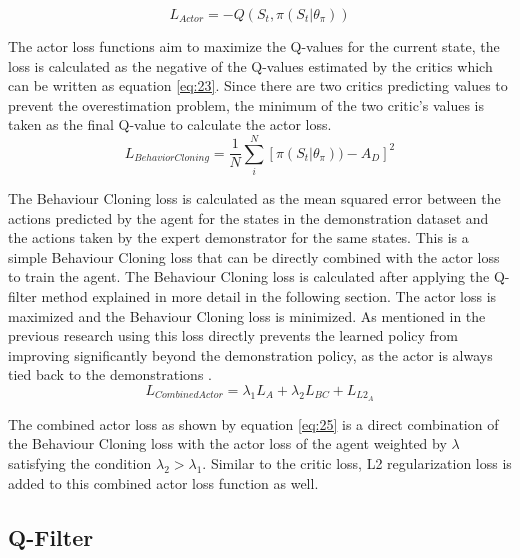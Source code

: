 \begin{equation}\label{eq:23}
    L_{Actor} = -Q(S_{t}, \pi(S_{t} | \theta_\pi ))
\end{equation}

The actor loss functions aim to maximize the Q-values for the current state, the loss is calculated as the negative of the Q-values estimated by the critics which can be written as equation \ref{eq:23}. Since there are two critics predicting values to prevent the overestimation problem, the minimum of the two critic's values is taken as the final Q-value to calculate the actor loss. \\

\begin{equation}\label{eq:24}
    L_{BehaviorCloning} = \frac{1}{N} \sum_{i}^{N} [\pi(S_{t} | \theta_\pi )) - A_D ]^2
\end{equation}

The Behaviour Cloning loss is calculated as the mean squared error \cite{MSE} between the actions predicted by the agent for the states in the demonstration dataset and the actions taken by the expert demonstrator for the same states. This is a simple Behaviour Cloning loss that can be directly combined with the actor loss to train the agent. The Behaviour Cloning loss is calculated after applying the Q-filter method explained in more detail in the following section. The actor loss is maximized and the Behaviour Cloning loss is minimized. As mentioned in the previous research using this loss directly prevents the learned policy from improving significantly beyond the demonstration policy, as the actor is always tied back to the demonstrations \cite{nair2018overcoming}. \\

\begin{equation}\label{eq:25}
    L_{CombinedActor} = \lambda_{1} L_A + \lambda_{2} L_{BC} + L_{L2_{A}}
\end{equation}

The combined actor loss as shown by equation \ref{eq:25} is a direct combination of the Behaviour Cloning loss with the actor loss of the agent weighted by $\lambda$ satisfying the condition $\lambda_{2}>\lambda_{1}$. Similar to the critic loss, L2 regularization loss is added to this combined actor loss function as well. \\

\subsection{Q-Filter}

